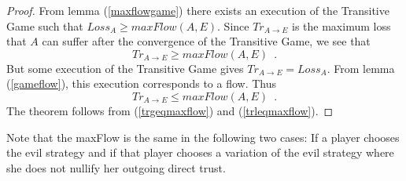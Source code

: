 \documentclass[11pt]{llncs}
\theoremstyle{definition}
\newenvironment{proofsketch}{\textit{Proof Sketch.}}{\qed \smallskip \ \\}
\begin{document}
    \begin{proof}%
       From lemma (\ref{maxflowgame}) there exists an execution of the Transitive Game such that
       $Loss_A \geq maxFlow\left(A, E\right)$.
       Since $Tr_{A \rightarrow E}$ is the maximum loss that $A$ can suffer after the convergence of the Transitive Game, we
       see that
       \begin{equation}
       \label{trgeqmaxflow}
          Tr_{A \rightarrow E} \geq maxFlow\left(A, E\right) \enspace.
       \end{equation}
       But some execution of the Transitive Game gives $Tr_{A \rightarrow E} = Loss_A$.
       From lemma (\ref{gameflow}), this execution corresponds to a flow. Thus
       \begin{equation}
       \label{trleqmaxflow}
          Tr_{A \rightarrow E} \leq maxFlow\left(A, E\right) \enspace.
       \end{equation}
       The theorem follows from (\ref{trgeqmaxflow}) and (\ref{trleqmaxflow}).
    \end{proof}

     Note that the maxFlow is the same in the following two cases: If a player chooses the evil strategy and if that player
     chooses a variation of the evil strategy where she does not nullify her outgoing direct trust.
\end{document}
